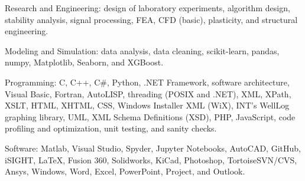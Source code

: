 \documentclass{leresume}
\begin{document}
    \begin{bulletedlist}
		
		\item Research and Engineering: design of laboratory experiments,
                        algorithm design,
                        stability analysis,
                        signal processing,
                        FEA,
                        CFD (basic),
                        plasticity,
                        and structural engineering.
                        
		\item Modeling and Simulation: data analysis,
                        data cleaning,
                        scikit-learn,
                        pandas,
                        numpy,
                        Matplotlib,
                        Seaborn,
                        and XGBoost.
                        
		\item Programming: C,
                        C++,
                        C\#,
                        Python,
                        .NET Framework,
                        software architecture,
                        Visual Basic,
                        Fortran,
                        AutoLISP,
                        threading (POSIX and .NET),
                        XML,
                        XPath,
                        XSLT,
                        HTML,
                        XHTML,
                        CSS,
                        Windows Installer XML (WiX),
                        INT's WellLog graphing library,
                        UML,
                        XML Schema Definitions (XSD),
                        PHP,
                        JavaScript,
                        code profiling and optimization,
                        unit testing,
                        and sanity checks.
                        
		\item Software: Matlab,
                        Visual Studio,
                        Spyder,
                        Jupyter Notebooks,
                        AutoCAD,
                        GitHub,
                        iSIGHT,
                        LaTeX,
                        Fusion 360,
                        Solidworks,
                        KiCad,
                        Photoshop,
                        TortoiseSVN/CVS,
                        Ansys,
                        Windows,
                        Word,
                        Excel,
                        PowerPoint,
                        Project,
                        and Outlook.
                        

\end{bulletedlist}
\end{document}
